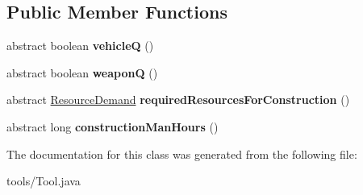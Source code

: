 \subsection*{Public Member Functions}
\begin{DoxyCompactItemize}
\item 
abstract boolean {\bfseries vehicleQ} ()\hypertarget{classtools_1_1_tool_a7c75a753d0de1d17801367c56d0dbfcd}{}\label{classtools_1_1_tool_a7c75a753d0de1d17801367c56d0dbfcd}

\item 
abstract boolean {\bfseries weaponQ} ()\hypertarget{classtools_1_1_tool_a0c5b08b98e1577d58eb3d1d1a867ad21}{}\label{classtools_1_1_tool_a0c5b08b98e1577d58eb3d1d1a867ad21}

\item 
abstract \hyperlink{classuniverse_1_1_resource_demand}{Resource\+Demand} {\bfseries required\+Resources\+For\+Construction} ()\hypertarget{classtools_1_1_tool_a886fb5e272c7b471b91df8a3dbcad61c}{}\label{classtools_1_1_tool_a886fb5e272c7b471b91df8a3dbcad61c}

\item 
abstract long {\bfseries construction\+Man\+Hours} ()\hypertarget{classtools_1_1_tool_aafd4b1569d51e92ae3c591f119f40690}{}\label{classtools_1_1_tool_aafd4b1569d51e92ae3c591f119f40690}

\end{DoxyCompactItemize}


The documentation for this class was generated from the following file\+:\begin{DoxyCompactItemize}
\item 
tools/Tool.\+java\end{DoxyCompactItemize}
